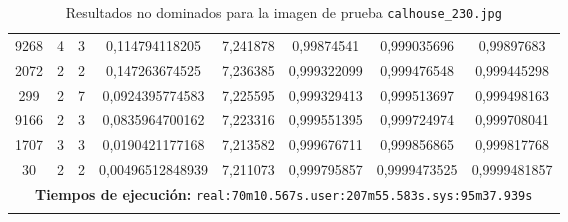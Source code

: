 \begin{longtable}{|c|c|c|c|c|c|c|c|}
9268 & 4 & 3 & 0,114794118205 & 7,241878 & 0,99874541 & 0,999035696 & 0,99897683 \\
2072 & 2 & 2 & 0,147263674525 & 7,236385 & 0,999322099 & 0,999476548 & 0,999445298 \\
299 & 2 & 7 & 0,0924395774583 & 7,225595 & 0,999329413 & 0,999513697 & 0,999498163 \\
9166 & 2 & 3 & 0,0835964700162 & 7,223316 & 0,999551395 & 0,999724974 & 0,999708041 \\
1707 & 3 & 3 & 0,0190421177168 & 7,213582 & 0,999676711 & 0,999856865 & 0,999817768 \\
30 & 2 & 2 & 0,00496512848939 & 7,211073 & 0,999795857 & 0,9999473525 & 0,9999481857 \\
\hline
\multicolumn{8}{|c|}{\textbf{Tiempos de ejecución:} \texttt{real:70m10.567s.user:207m55.583s.sys:95m37.939s}}\\ \hline
\caption{Resultados no dominados para la imagen de prueba \texttt{calhouse\_230.jpg}}
\label{tab:calhouse_230}
\end{longtable}
\normalsize

